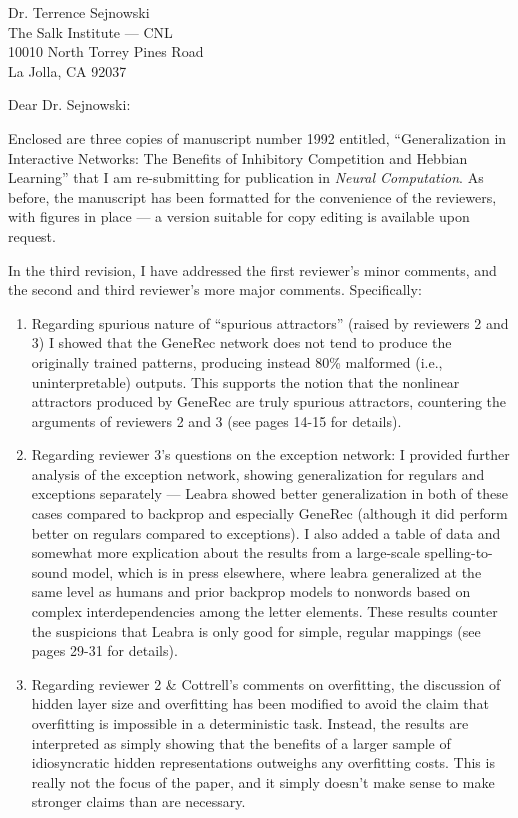 \documentclass [11pt]{letter}
\begin{document}
\begin{letter}
{Dr. Terrence Sejnowski\\
The Salk Institute --- CNL\\
10010 North Torrey Pines Road\\
La Jolla, CA 92037\\}

\opening{Dear Dr. Sejnowski:}

Enclosed are three copies of manuscript number 1992 entitled,
``Generalization in Interactive Networks: The Benefits of Inhibitory
Competition and Hebbian Learning'' that I am re-submitting for
publication in {\em Neural Computation}.  As before, the manuscript
has been formatted for the convenience of the reviewers, with figures
in place --- a version suitable for copy editing is available upon
request.

In the third revision, I have addressed the first reviewer's minor
comments, and the second and third reviewer's more major comments.
Specifically: 

\begin{enumerate}
\item Regarding spurious nature of ``spurious attractors'' (raised by
  reviewers 2 and 3) I showed that the GeneRec network does not tend
  to produce the originally trained patterns, producing instead 80\%
  malformed (i.e., uninterpretable) outputs.  This supports the notion
  that the nonlinear attractors produced by GeneRec are truly spurious
  attractors, countering the arguments of reviewers 2 and 3 (see pages
  14-15 for details).
  
\item Regarding reviewer 3's questions on the exception network: I
  provided further analysis of the exception network, showing
  generalization for regulars and exceptions separately --- Leabra
  showed better generalization in both of these cases compared to
  backprop and especially GeneRec (although it did perform better on
  regulars compared to exceptions).  I also added a table of data and
  somewhat more explication about the results from a large-scale
  spelling-to-sound model, which is in press elsewhere, where leabra
  generalized at the same level as humans and prior backprop models to
  nonwords based on complex interdependencies among the letter
  elements.  These results counter the suspicions that Leabra is only
  good for simple, regular mappings (see pages 29-31 for details).
  
\item Regarding reviewer 2 \& Cottrell's comments on overfitting, the
  discussion of hidden layer size and overfitting has been modified to
  avoid the claim that overfitting is impossible in a deterministic
  task.  Instead, the results are interpreted as simply showing that
  the benefits of a larger sample of idiosyncratic hidden
  representations outweighs any overfitting costs.  This is really not
  the focus of the paper, and it simply doesn't make sense to make
  stronger claims than are necessary.
  

\end{enumerate}
\end{letter}
\end{document}
